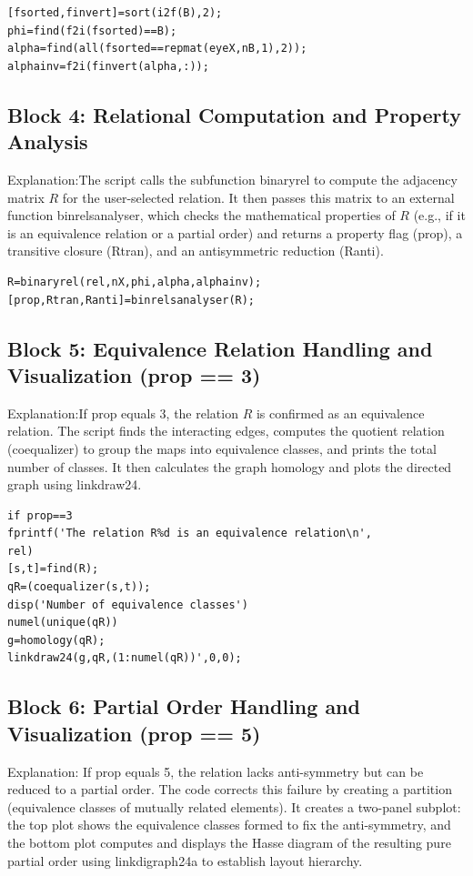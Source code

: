 \begin{lstlisting}
[fsorted,finvert]=sort(i2f(B),2);
phi=find(f2i(fsorted)==B); 
alpha=find(all(fsorted==repmat(eyeX,nB,1),2)); 
alphainv=f2i(finvert(alpha,:));
\end{lstlisting}



\subsection*{ \hspace*{0.2cm} Block 4: Relational Computation and Property Analysis}
 Explanation:The script calls the subfunction binaryrel to compute the adjacency matrix $R$ for the user-selected relation. It then passes this matrix to an external function binrelsanalyser, which checks the mathematical properties of $R$ (e.g., if it is an equivalence relation or a partial order) and returns a property flag (prop), a transitive closure (Rtran), and an antisymmetric reduction (Ranti).

 \begin{lstlisting}
R=binaryrel(rel,nX,phi,alpha,alphainv);
[prop,Rtran,Ranti]=binrelsanalyser(R);
\end{lstlisting}



\subsection*{ \hspace*{0.2cm} Block 5: Equivalence Relation Handling and Visualization (prop == 3)}
 Explanation:If prop equals 3, the relation $R$ is confirmed as an equivalence relation. The script finds the interacting edges, computes the quotient relation (coequalizer) to group the maps into equivalence classes, and prints the total number of classes. It then calculates the graph homology and plots the directed graph using linkdraw24.

 \begin{lstlisting}
if prop==3
fprintf('The relation R%d is an equivalence relation\n',
rel)    
[s,t]=find(R);
qR=(coequalizer(s,t));
disp('Number of equivalence classes')
numel(unique(qR))   
g=homology(qR);
linkdraw24(g,qR,(1:numel(qR))',0,0);
\end{lstlisting}


\subsection*{\hspace*{0.2cm} Block 6: Partial Order Handling and Visualization (prop == 5)}
Explanation:
If prop equals 5, the relation lacks anti-symmetry but can be reduced to a partial order. The code corrects this failure by creating a partition (equivalence classes of mutually related elements). It creates a two-panel subplot: the top plot shows the equivalence classes formed to fix the anti-symmetry, and the bottom plot computes and displays the Hasse diagram of the resulting pure partial order using linkdigraph24a to establish layout hierarchy.

